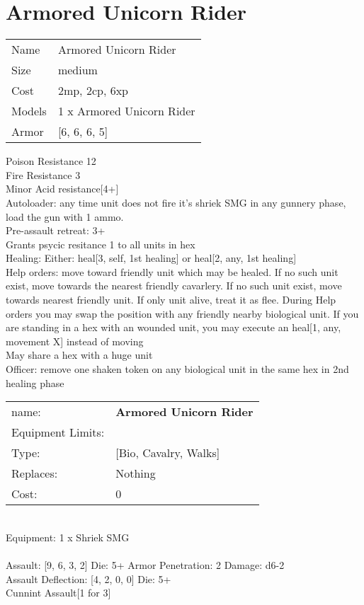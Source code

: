 \pagebreak\pagebreak

\section{ Armored Unicorn Rider }

\begin{tabular}{ll}
  Name & Armored Unicorn Rider \\
  Size & medium\\
  Cost & 2mp, 2cp, 6xp\\
  Models & 1 x Armored Unicorn Rider\\
  Armor & [6, 6, 6, 5]\\
\end{tabular}

\noindent Poison Resistance 12\\ 
Fire Resistance 3\\ 
Minor Acid resistance[4+]\\ 
Autoloader: any time unit does not fire it's shriek SMG in any gunnery phase, load the gun with 1 ammo.\\ 
Pre-assault retreat: 3+\\ 
Grants psycic resitance 1 to all units in hex\\ 
Healing: Either: heal[3, self, 1st healing] or heal[2, any, 1st healing]\\ 
Help orders: move toward friendly unit which may be healed. If no such unit exist, move towards the nearest friendly cavarlery. If no such unit exist, move towards nearest friendly unit. If only unit alive, treat it as flee. During Help orders you may swap the position with any friendly nearby biological unit. If you are standing in a hex with an wounded unit, you may execute an heal[1, any, movement X] instead of moving\\ 
May share a hex with a huge unit\\ 
Officer: remove one shaken token on any biological unit in the same hex in 2nd healing  phase\\ 


\noindent
\begin{tabular}{ll}
name: &{\bf Armored Unicorn Rider } \\
Equipment Limits: & \\
Type: &[Bio, Cavalry, Walks] \\
Replaces: &Nothing \\
Cost: & 0\\
\end{tabular}
\ \\
Equipment: 1 x Shriek SMG \\
\ \\
Assault: [9, 6, 3, 2] Die: 5+ Armor Penetration: 2 Damage: d6-2 \\
Assault Deflection: [4, 2, 0, 0] Die: 5+\\
\indent Cunnint Assault[1 for 3]\\ 
 
